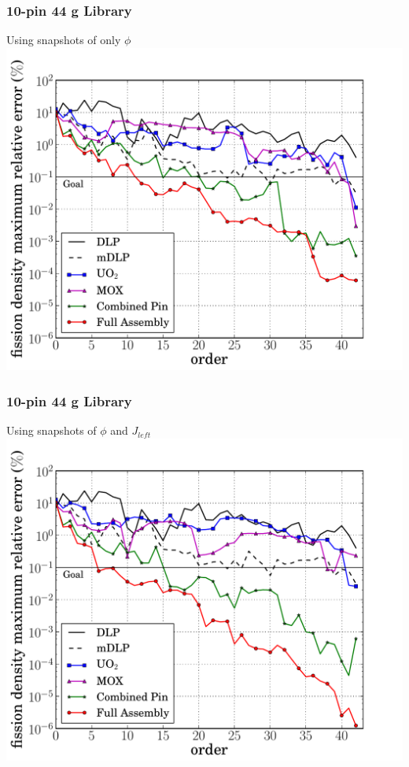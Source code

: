 \documentclass[fleqn]{beamer}
\begin{document}
  \begin{frame}
    \frametitle{10-pin 44 g Library}
    \begin{center}
    Using snapshots of only $\phi$
    \includegraphics[trim=.1cm .25cm 2.0cm .4cm, clip=true, totalheight=.8\textheight]{10pin_44_energy_basis_comparison_fission-44}
    \end{center}
  \end{frame}

  \begin{frame}
    \frametitle{10-pin 44 g Library}
    \begin{center}
    Using snapshots of $\phi$ and $J_{left}$
    \includegraphics[trim=.1cm .25cm 2.0cm .4cm, clip=true, totalheight=.8\textheight]{10pin_44_partial_energy_basis_comparison_fission-44}
    \end{center}
  \end{frame}
\end{document}
